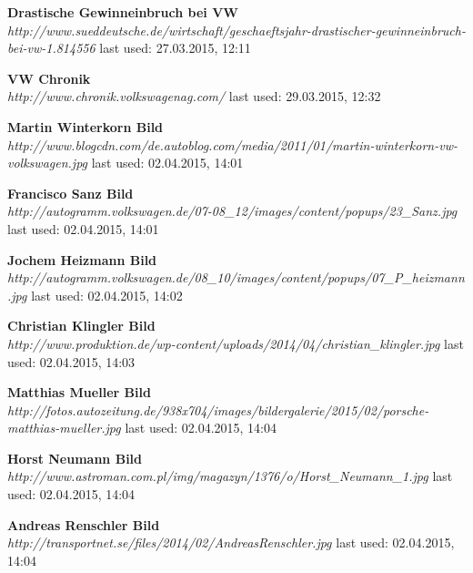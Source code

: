 \documentclass[12pt]{article}
\begin{document}
\begin{thebibliography}{56}
  \textbf{Drastische Gewinneinbruch bei VW} \\
  \textit{
  	http://www.sueddeutsche.de/wirtschaft/geschaeftsjahr-drastischer-gewinneinbruch-bei-vw-1.814556
  }
  \newline last used: 27.03.2015, 12:11
  
  \textbf{VW Chronik} \\
  \textit{
  	http://www.chronik.volkswagenag.com/
  }
  \newline last used: 29.03.2015, 12:32

\textbf{Martin Winterkorn Bild} \\
\textit{
	http://www.blogcdn.com/de.autoblog.com/media/2011/01/martin-winterkorn-vw-volkswagen.jpg
}
\newline last used: 02.04.2015, 14:01

\textbf{Francisco Sanz Bild} \\
\textit{
	http://autogramm.volkswagen.de/07-08\_12/images/content/popups/23\_Sanz.jpg
}
\newline last used: 02.04.2015, 14:01

\textbf{Jochem Heizmann Bild} \\
\textit{
	http://autogramm.volkswagen.de/08\_10/images/content/popups/07\_P\_heizmann.jpg
}
\newline last used: 02.04.2015, 14:02

\textbf{Christian Klingler Bild} \\
\textit{
	http://www.produktion.de/wp-content/uploads/2014/04/christian\_klingler.jpg
}
\newline last used: 02.04.2015, 14:03

\textbf{Matthias Mueller Bild} \\
\textit{
	http://fotos.autozeitung.de/938x704/images/bildergalerie/2015/02/porsche-matthias-mueller.jpg
}
\newline last used: 02.04.2015, 14:04

\textbf{Horst Neumann Bild} \\
\textit{
	http://www.astroman.com.pl/img/magazyn/1376/o/Horst\_Neumann\_1.jpg
}
\newline last used: 02.04.2015, 14:04

\textbf{Andreas Renschler Bild} \\
\textit{
	http://transportnet.se/files/2014/02/AndreasRenschler.jpg
}
\newline last used: 02.04.2015, 14:04


\end{thebibliography}
\end{document}
